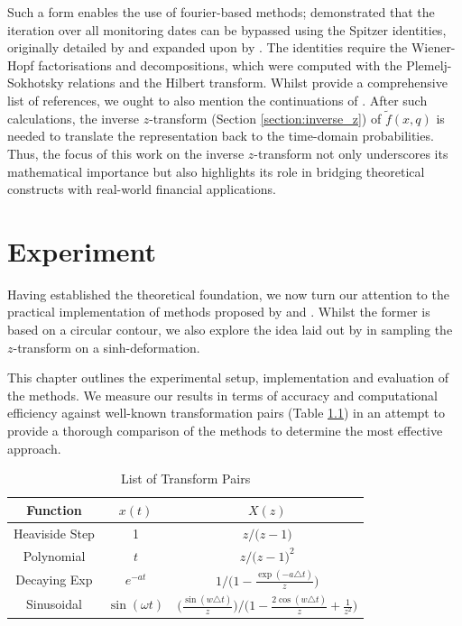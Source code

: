 \documentclass[a4paper]{report}
\begin{document}
Such a form enables the use of fourier-based methods; \citet{fusai2016spitzer} demonstrated that the iteration over all monitoring dates can be bypassed using the Spitzer identities, originally detailed by \citet{spitzer1957wiener} and expanded upon by \citet{kemperman1963wiener}. The identities require the Wiener-Hopf factorisations and decompositions, which were computed with the Plemelj-Sokhotsky relations and the Hilbert transform. Whilst \citet{fusai2016spitzer} provide a comprehensive list of references, we ought to also mention the continuations of \citet{phelan2018fluctuation, phelan2019hilbert, loveless2023phelanguido}. After such calculations, the inverse $z$-transform (Section \ref{section:inverse_z}) of $\tilde{f}(x, q)$ is needed to translate the representation back to the time-domain probabilities. Thus, the focus of this work on the inverse $z$-transform not only underscores its mathematical importance but also highlights its role in bridging theoretical constructs with real-world financial applications. 

\chapter{Experiment}
Having established the theoretical foundation, we now turn our attention to the practical implementation of methods proposed by \citet{AbateWhitt1992a, AbateWhitt1992b} and \citet{Cavers1978FFT}. Whilst the former is based on a circular contour, we also explore the idea laid out by \citet{levendorskii2022sinh} in sampling the $z$-transform on a sinh-deformation.

This chapter outlines the experimental setup, implementation and evaluation of the methods. We measure our results in terms of accuracy and computational efficiency against well-known transformation pairs (Table \ref{table:transform_pairs}) in an attempt to provide a thorough comparison of the methods to determine the most effective approach.

\begin{table}[H]
    \centering
    \begin{tabular}{c|cc}
    \hline
    \textbf{Function} & $x(t)$ & $X(z)$ \\
    \hline
    Heaviside Step & 1 & $z / \textbf{(}z-1\textbf{)}$ \\
    Polynomial & \(t\) & $z / \textbf{(}z-1\textbf{)}^2 $ \\
    Decaying Exp & $e^{-at}$ & $1 / \textbf{(}1 - \frac{\exp(-a\triangle t)}{z} \textbf{)}$ \\
    Sinusoidal & $\sin(\omega t)$ & $\textbf{(}\frac{\sin(w\triangle t)}{z}\textbf{)} / \textbf{(}1-\frac{2\cos(w\triangle t)}{z} + \frac{1}{z^2}\textbf{)}$
    \end{tabular}
    \caption{List of Transform Pairs}
    \label{table:transform_pairs}
\end{table}
\end{document}
